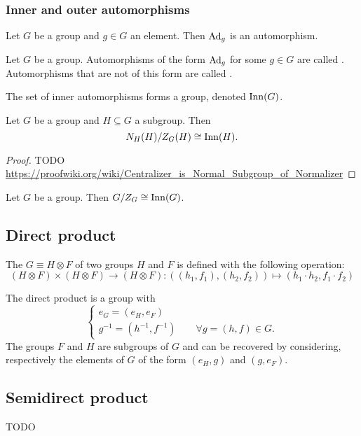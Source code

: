 \subsubsection{Inner and outer automorphisms}
\begin{lemma}
Let $G$ be a group and $g\in G$ an element. Then $\operatorname{Ad}_g$ is an automorphism.
\end{lemma}
\begin{definition}
Let $G$ be a group.
Automorphisms of the form $\operatorname{Ad}_g$ for some $g\in G$ are called . Automorphisms that are not of this form are called .

The set of inner automorphisms forms a group, denoted $\operatorname{Inn}(G)$.
\end{definition}

\begin{theorem}[N/C theorem]
Let $G$ be a group and $H\subseteq G$ a subgroup. Then
\[ N_H(H) / Z_G(H) \cong \operatorname{Inn}(H). \]
\end{theorem}
\begin{proof}
TODO \url{https://proofwiki.org/wiki/Centralizer_is_Normal_Subgroup_of_Normalizer}
\end{proof}
\begin{corollary}
Let $G$ be a group. Then $G / Z_G \cong \operatorname{Inn}(G)$.
\end{corollary}


\subsection{Direct product}
\begin{definition}
The  $G \equiv H\otimes F$ of two groups $H$ and $F$ is defined with the following operation:
\[ (H\otimes F) \times (H\otimes F) \rightarrow (H\otimes F): ((h_1,f_1),(h_2,f_2)) \mapsto (h_1\cdot h_2, f_1\cdot f_2)\]
\end{definition}
The direct product is a group with
\[ \begin{cases}
e_G = (e_H,e_F) \\
g^{-1} = (h^{-1}, f^{-1})\qquad \forall g = (h,f) \in G.
\end{cases} \]
The groups $F$ and $H$ are subgroups of $G$ and can be recovered by considering, respectively the elements of $G$ of the form $(e_H, g)$ and $(g ,e_F)$.

\subsection{Semidirect product}
TODO

